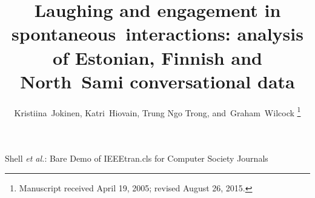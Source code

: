 \documentclass[10pt,journal,compsoc]{IEEEtran}
\begin{document}
\title{Laughing and engagement in spontaneous~interactions:
       analysis of Estonian, Finnish and North~Sami conversational data}

\author{Kristiina~Jokinen, Katri~Hiovain, Trung Ngo Trong,
        and~Graham~Wilcock%
\thanks{Manuscript received April 19, 2005; revised August 26, 2015.}}

%
{Shell \MakeLowercase{\textit{et al.}}: Bare Demo of IEEEtran.cls for Computer Society Journals}
\end{document}
